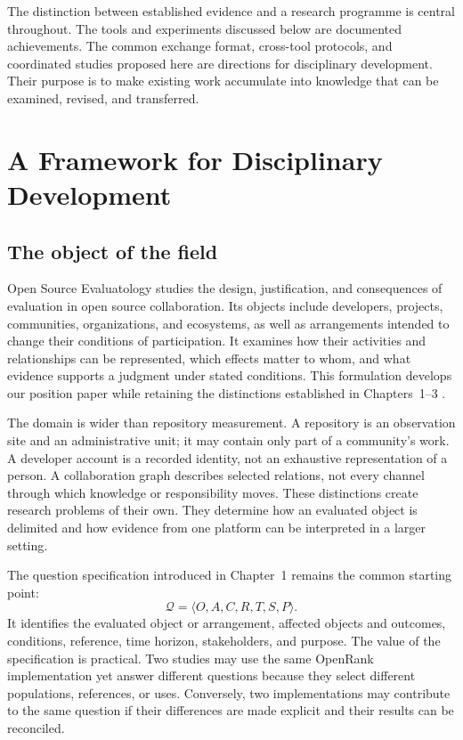 The distinction between established evidence and a research programme is central throughout. The tools and experiments discussed below are documented achievements. The common exchange format, cross-tool protocols, and coordinated studies proposed here are directions for disciplinary development. Their purpose is to make existing work accumulate into knowledge that can be examined, revised, and transferred.

\FloatBarrier
\section{A Framework for Disciplinary Development}
\label{sec:ch11-framework}

\subsection{The object of the field}
Open Source Evaluatology studies the design, justification, and consequences of evaluation in open source collaboration. Its objects include developers, projects, communities, organizations, and ecosystems, as well as arrangements intended to change their conditions of participation. It examines how their activities and relationships can be represented, which effects matter to whom, and what evidence supports a judgment under stated conditions. This formulation develops our position paper while retaining the distinctions established in Chapters~1--3 \citep{han2024ose,zhan2026book}.

The domain is wider than repository measurement. A repository is an observation site and an administrative unit; it may contain only part of a community's work. A developer account is a recorded identity, not an exhaustive representation of a person. A collaboration graph describes selected relations, not every channel through which knowledge or responsibility moves. These distinctions create research problems of their own. They determine how an evaluated object is delimited and how evidence from one platform can be interpreted in a larger setting.

The question specification introduced in Chapter~1 remains the common starting point:
\[
\mathcal Q=\langle O,A,C,R,T,S,P\rangle.
\]
It identifies the evaluated object or arrangement, affected objects and outcomes, conditions, reference, time horizon, stakeholders, and purpose. The value of the specification is practical. Two studies may use the same OpenRank implementation yet answer different questions because they select different populations, references, or uses. Conversely, two implementations may contribute to the same question if their differences are made explicit and their results can be reconciled.


